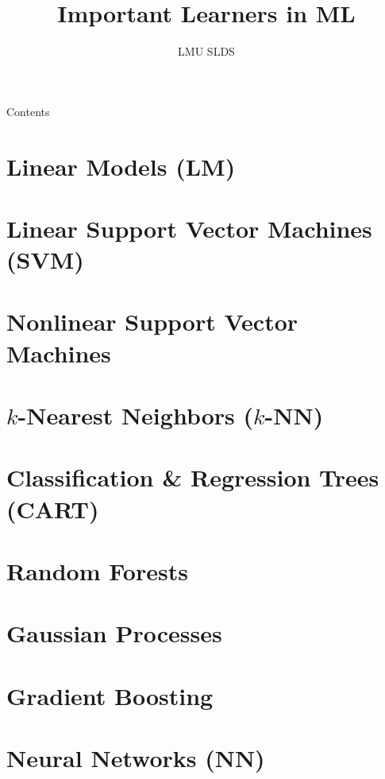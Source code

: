 \documentclass[11pt, t, aspectratio=169]{beamer}
\title{Important Learners in ML}
\institute{\href{https://compstat-lmu.github.io/lecture_i2ml/}{
compstat-lmu.github.io/lecture\_i2ml}}
\author{LMU SLDS}
\date{}
\begin{document}
\lecturechapter{}

\begin{frame}{Contents}
  \tableofcontents
\end{frame}

\footnotesize

\setdraft

\section{Linear Models (LM)}


% 

\section{Linear Support Vector Machines (SVM)}


\section{Nonlinear Support Vector Machines}


\section{$k$-Nearest Neighbors ($k$-NN)}


\section{Classification \& Regression Trees (CART)}


\section{Random Forests}


\section{Gaussian Processes}


\section{Gradient Boosting}


\section{Neural Networks (NN)}


\endlecture
\end{document}
